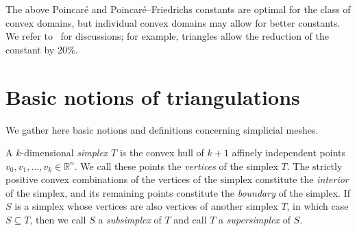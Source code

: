 \documentclass[10pt,a4paper]{article}
\begin{document}

\begin{remark}
    The above Poincar\'e and Poincar\'e--Friedrichs constants are optimal for the class of convex domains, 
    but individual convex domains may allow for better constants.
    We refer to~\cite{Liu_Kik_interp_10, Cars_Ged_Rim_expl_cnst_12, matculevich2016explicit} for discussions;
    for example, triangles allow the reduction of the constant by 20\%.
\end{remark}


































\section{Basic notions of triangulations}\label{section:triangulations}

We gather here basic notions and definitions concerning simplicial meshes. 
  

A ${k}$-dimensional \emph{simplex} $T$ is the convex hull of ${k}+1$ affinely independent points $v_0, v_1, \ldots, v_{{k}} \in \mathbb{R}^{n}$. We call these points the \emph{vertices} of the simplex $T$. 
The strictly positive convex combinations of the vertices of the simplex constitute the \emph{ interior} of the simplex,
and its remaining points constitute the \emph{boundary} of the simplex.
If $S$ is a simplex whose vertices are also vertices of another simplex $T$, in which case $S \subseteq T$, 
then we call $S$ a \emph{subsimplex} of $T$ and call $T$ a \emph{supersimplex} of $S$. 
\end{document}
